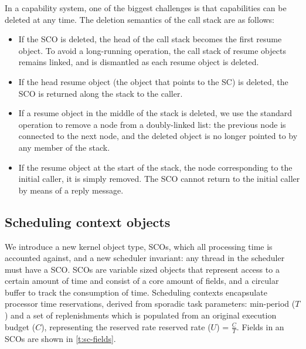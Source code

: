 In a capability system, one of the biggest challenges is that capabilities can be deleted at any
time. The deletion semantics of the call stack are as follows: 
\begin{itemize}
    \item If the \gls{SCO} is deleted, the head of the call stack becomes the first resume object. To avoid
        a long-running operation, the call stack of resume objects remains linked, and is dismantled
        as each resume object is deleted.
    \item If the head resume object (the object that points to the SC) is deleted, the \gls{SCO} is
        returned along the stack to the caller. 
    \item If a resume object in the middle of the stack is deleted, we use the standard operation to
        remove a node from a doubly-linked list: the previous node is connected to the next node,
        and the deleted object is no longer pointed to by any member of the stack.
    \item If the resume object at the start of the stack, the node corresponding to the initial
        caller, it is simply removed. The \gls{SCO} cannot return to the initial caller by means of a reply
        message.
\end{itemize}
    
\subsection{Scheduling context objects}
\label{s:sco}

We introduce a new kernel object type, \glspl{SCO}, which all processing time is accounted against, 
and a new scheduler invariant: any thread in the scheduler must have a \gls{SCO}. 
\glspl{SCO} are variable sized objects that represent access to a certain amount of time and
consist of a core amount of fields, and a circular buffer to track the consumption of time.
Scheduling contexts encapsulate processor time reservations,
derived from sporadic task parameters: min-period ($T$) and a set of replenishments which is
populated from an original execution budget ($C$), representing the reserved rate reserved rate
($U$) = $\frac{C}{T}$.
Fields in an \glspl{SCO} are shown in \cref{t:sc-fields}.

